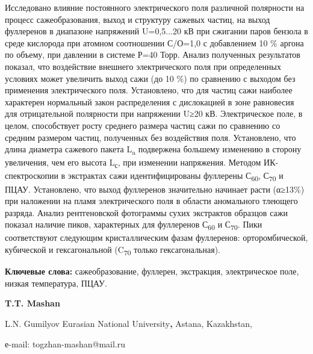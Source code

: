 Исследовано влияние постоянного электрического поля различной полярности
на процесс сажеобразования, выход и структуру сажевых частиц, на выход
фуллеренов в диапазоне напряжений U=0,5...20 кВ при сжигании паров
бензола в среде кислорода при атомном соотношении С/О=1,0 с добавлением
10 \% аргона по объему, при давлении в системе Р=40 Торр. Анализ
полученных результатов показал, что воздействие внешнего электрического
поля при определенных условиях может увеличить выход сажи (до 10 \%) по
сравнению с выходом без применения электрического поля. Установлено, что
для частиц сажи наиболее характерен нормальный закон распределения с
дислокацией в зоне равновесия для отрицательной полярности при
напряжении U≥20 кВ. Электрическое поле, в целом, способствует росту
среднего размера частиц сажи по сравнению со средним размером частиц,
полученных без воздействия поля. Установлено, что длина диаметра
сажевого пакета L\textsubscript{a} подвержена большему изменению в
сторону увеличения, чем его высота L\textsubscript{с}, при изменении
напряжения. Методом ИК-спектроскопии в экстрактах сажи идентифицированы
фуллерены С\textsubscript{60}, С\textsubscript{70} и ПЦАУ. Установлено,
что выход фуллеренов значительно начинает расти (α≥13\%) при наложении
на пламя электрического поля в области аномального тлеющего разряда.
Анализ рентгеновской фотограммы сухих экстрактов образцов сажи показал
наличие пиков, характерных для фуллеренов С\textsubscript{60} и
С\textsubscript{70}. Пики соответствуют следующим кристаллическим фазам
фуллеренов: орторомбической, кубической и гексагональной
(C\textsubscript{70} только гексагональная).

{\bfseries Ключевые слова:} сажеобразование, фуллерен, экстракция,
электрическое поле, низкая температура, ПЦАУ.


\begin{center}
{\bfseries T.T. Mashan}

L.N. Gumilyov Eurasian National University{\bfseries ,} Astana, Kazakhstan,

е-mail: togzhan-mashan@mail.ru
\end{center}

